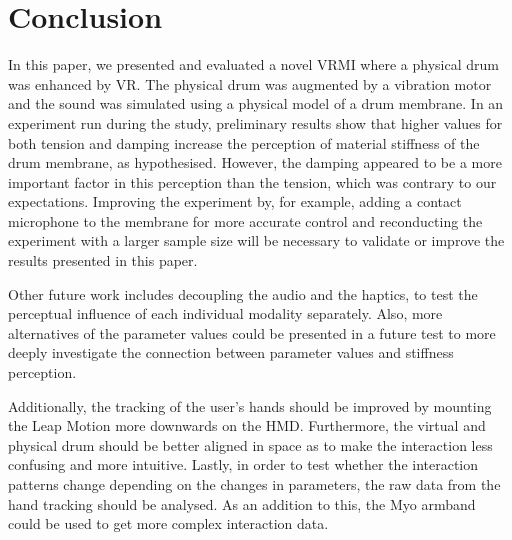 \documentclass{article}
\begin{document}

\section{Conclusion}\label{sec:conc}

In this paper, we presented and evaluated a novel VRMI where a physical drum was enhanced by VR. The physical drum was augmented by a vibration motor and the sound was simulated using a physical model of a drum membrane. In an experiment run during the study, preliminary results show that higher values for both tension and damping increase the perception of material stiffness of the drum membrane, as hypothesised. However, the damping appeared to be a more important factor in this perception than the tension, which was contrary to our expectations. Improving the experiment by, for example, adding a contact microphone to the membrane for more accurate control and reconducting the experiment with a larger sample size will be necessary to validate or improve the results presented in this paper.

Other future work includes decoupling the audio and the haptics, to test the perceptual influence of each individual modality separately. Also, more alternatives of the parameter values could be presented in a future test to more deeply investigate the connection between parameter values and stiffness perception.

Additionally, the tracking of the user's hands should be improved by mounting the Leap Motion more downwards on the HMD. Furthermore, the virtual and physical drum should be better aligned in space as to make the interaction less confusing and more intuitive.
Lastly, in order to test whether the interaction patterns change depending on the changes in parameters, the raw data from the hand tracking should be analysed. As an addition to this, the Myo armband could be used to get more complex interaction data.
\end{document}

